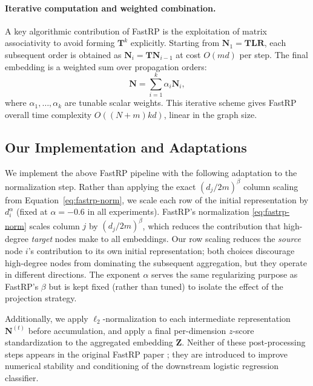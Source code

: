 \documentclass[conference]{IEEEtran}
\begin{document}
\paragraph{Iterative computation and weighted combination.}
A key algorithmic contribution of FastRP \cite{chen2019fast} is the
exploitation of matrix associativity to avoid forming $\mathbf{T}^k$
explicitly. Starting from $\mathbf{N}_1 = \mathbf{T}\mathbf{L}\mathbf{R}$,
each subsequent order is obtained as $\mathbf{N}_i = \mathbf{T}\mathbf{N}_{i-1}$
at cost $O(md)$ per step. The final embedding is a weighted sum over
propagation orders:
\begin{equation}
    \mathbf{N} = \sum_{i=1}^{k} \alpha_i \mathbf{N}_i,
    \label{eq:fastrp-combine}
\end{equation}
where $\alpha_1, \ldots, \alpha_k$ are tunable scalar weights. This
iterative scheme gives FastRP \cite{chen2019fast} overall time complexity
$O((N + m) k d)$, linear in the graph size.

\subsection{Our Implementation and Adaptations}
\label{subsec:implementation}

We implement the above FastRP pipeline with the following
adaptation to the normalization step. Rather than applying the exact
$(d_j/2m)^{\beta}$ column scaling from Equation~\eqref{eq:fastrp-norm},
we scale each row of the initial representation by $d_i^{\alpha}$ (fixed
at $\alpha = -0.6$ in all experiments). FastRP's normalization
\eqref{eq:fastrp-norm} scales column $j$ by $(d_j/2m)^\beta$, which
reduces the contribution that high-degree \emph{target} nodes make to
all embeddings. Our row scaling reduces the \emph{source} node $i$'s
contribution to its own initial representation; both choices discourage
high-degree nodes from dominating the subsequent aggregation, but they
operate in different directions. The exponent $\alpha$ serves the same
regularizing purpose as FastRP's $\beta$ but is kept fixed (rather than
tuned) to isolate the effect of the projection strategy.

Additionally, we apply $\ell_2$-normalization to each intermediate
representation $\mathbf{N}^{(t)}$ before accumulation, and apply a final
per-dimension $z$-score standardization to the aggregated embedding
$\mathbf{Z}$. Neither of these post-processing steps appears in the
original FastRP paper \cite{chen2019fast}; they are introduced to improve
numerical stability and conditioning of the downstream logistic regression
classifier.
\end{document}
